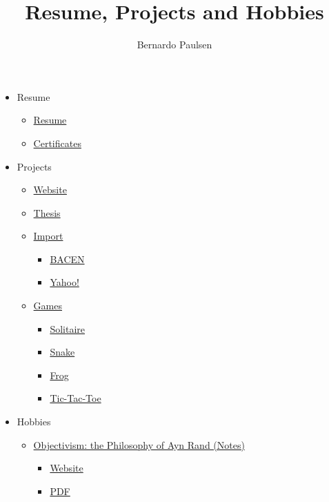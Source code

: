 \documentclass{article}
\title{Resume, Projects and Hobbies}
\author{Bernardo Paulsen}
\date{ }
\begin{document}
\maketitle


\begin{itemize}
    \item Resume
    \begin{itemize}
        \item \href{https://docs.google.com/viewer?url=https://github.com/bernardopaulsen/resume/raw/main/main.pdf}{Resume}
        \item \href{https://github.com/bernardopaulsen/certificates}{Certificates}
    \end{itemize}
    \item Projects
    \begin{itemize}
        \item \href{https://github.com/bernardopaulsen/bernardopaulsen.github.io}{Website}
        \item \href{https://github.com/bernardopaulsen/thesis}{Thesis}
        \item \href{https://github.com/bernardopaulsen/import}{Import}
        \begin{itemize}
            \item \href{https://github.com/bernardopaulsen/import/bacen}{BACEN}
            \item \href{https://github.com/bernardopaulsen/import/yahoo}{Yahoo!}
        \end{itemize}
        \item \href{https://github.com/bernardopaulsen/games}{Games}
        \begin{itemize}
            \item \href{https://github.com/bernardopaulsen/games/solitaire}{Solitaire}
            \item \href{https://github.com/bernardopaulsen/games/snake}{Snake}
            \item \href{https://github.com/bernardopaulsen/games/frog}{Frog}
            \item \href{https://github.com/bernardopaulsen/games/tictactoe}{Tic-Tac-Toe}
        \end{itemize}
    \end{itemize}
    \item Hobbies
    \begin{itemize}
        \item \href{https://github.com/bernardopaulsen/orthodox}{Objectivism: the Philosophy of Ayn Rand (Notes)}
        \begin{itemize}
            \item \href{https://htmlpreview.github.io/?https://github.com/bernardopaulsen/orthodox/blob/master/objectivism.html}{Website}
            \item \href{https://docs.google.com/viewer?url=https://github.com/bernardopaulsen/orthodox/raw/master/objectivism.pdf}{PDF}
    \end{itemize}
    \end{itemize}
\end{itemize}
\end{document}
